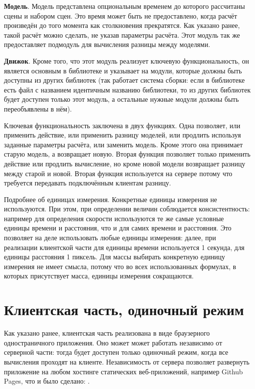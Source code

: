 \textbf{Модель}.\label{modeldescr}
Модель представлена опциональным временем до которого рассчитаны сцены и набором сцен.
Это время может быть не предоставлено, когда расчёт произведён до того момента как столкновения прекратятся.
Как указано ранее, такой расчёт можно сделать, не указав параметры расчёта.
Этот модуль так же предоставляет подмодуль для вычисления разницы между моделями.

\textbf{Движок}.\label{enginedescr}
Кроме того, что этот модуль реализует ключевую функциональность, он является основным в библиотеке и указывает на модули, которые
должны быть доступны из других библиотек (так работает система сборки:
если в библиотеке есть файл с названием идентичным названию библиотеки, то из других библиотек будет доступен только этот модуль,
а остальные нужные модули должны быть переобъявлены в нём).

Ключевая функциональность заключена в двух функциях.
Одна позволяет, или применить действие, или применить разницу моделей,
или продлить используя заданные параметры расчёта, или заменить модель.
Кроме этого она принимает старую модель, а возвращает новую.
Вторая функция позволяет только применить действие или продлить вычисление, но кроме новой модели
возвращает разницу между старой и новой. Вторая функция используется на сервере потому
что требуется передавать подключённым клиентам разницу.

\TODO

Подробнее об единицах измерения. Конкретные единицы измерения не используются.
При этом, при определении величин соблюдается консистентность: например для определения скорости используются
те же самые условные единицы времени и расстояния, что и для самих времени и расстояния. Это позволяет на деле использовать
любые единицы измерения: далее, при реализации клиентской части для единицы времени используется 1 секунда,
для единицы расстояния 1 пиксель. Для массы выбирать конкретную единицу измерения не имеет смысла, потому что во всех
использованных формулах, в которых присутствует масса, единицы измерения сокращаются.

\section{Клиентская часть, одиночный режим}\label{clientimpl}

\TODO

\TODO Как указано ранее, клиентская часть реализована в виде браузерного одностраничного приложения.
Оно может может работать независимо от серверной части: тогда будет доступен только одиночный режим,
когда все вычисления проходят на клиенте. Независимость от сервера позволяет развернуть приложение на
любом хостинге статических веб-приложений, например Github Pages, что и было сделано:
\underline{}.

